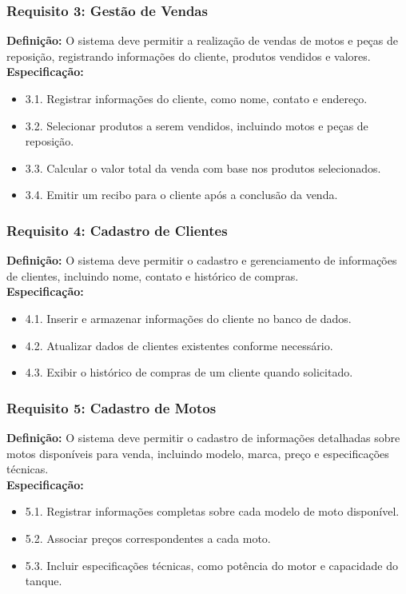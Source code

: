 \subsubsection{Requisito 3: Gestão de Vendas}
\textbf{Definição:} O sistema deve permitir a realização de vendas de motos e peças de reposição, registrando informações do cliente, produtos vendidos e valores.
\\
\textbf{Especificação:}
\begin{itemize}
	\item 3.1. Registrar informações do cliente, como nome, contato e endereço.
	\item 3.2. Selecionar produtos a serem vendidos, incluindo motos e peças de reposição.
	\item 3.3. Calcular o valor total da venda com base nos produtos selecionados.
	\item 3.4. Emitir um recibo para o cliente após a conclusão da venda.
\end{itemize}

\subsubsection{Requisito 4: Cadastro de Clientes}
\textbf{Definição:} O sistema deve permitir o cadastro e gerenciamento de informações de clientes, incluindo nome, contato e histórico de compras.
\\
\textbf{Especificação:}
\begin{itemize}
	\item 4.1. Inserir e armazenar informações do cliente no banco de dados.
	\item 4.2. Atualizar dados de clientes existentes conforme necessário.
	\item 4.3. Exibir o histórico de compras de um cliente quando solicitado.
\end{itemize}

\subsubsection{Requisito 5: Cadastro de Motos}
\textbf{Definição:} O sistema deve permitir o cadastro de informações detalhadas sobre motos disponíveis para venda, incluindo modelo, marca, preço e especificações técnicas.
\\
\textbf{Especificação:}
\begin{itemize}
	\item 5.1. Registrar informações completas sobre cada modelo de moto disponível.
	\item 5.2. Associar preços correspondentes a cada moto.
	\item 5.3. Incluir especificações técnicas, como potência do motor e capacidade do tanque.
\end{itemize}

